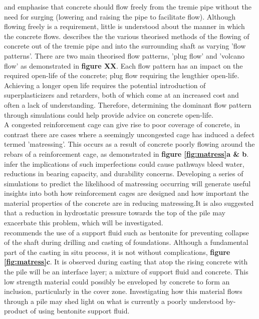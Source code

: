 \noindent
{} and  emphasise that concrete should flow freely from the tremie pipe without the need for surging (lowering and raising the pipe to facilitate flow). Although flowing freely is a requirement, little is understood about the manner in which the concrete flows.  describes the the various theorised methods of the flowing of concrete out of the tremie pipe and into the surrounding shaft as varying 'flow patterns'. There are two main theorised flow patterns, 'plug flow' and 'volcano flow' as demonstrated in {\bfseries figure XX}. Each flow pattern has an impact on the required open-life of the concrete; plug flow requiring the lengthier open-life. Achieving a longer open life requires the potential introduction of superplasticizers and retarders, both of which come at an increased cost and often a lack of understanding. Therefore, determining the dominant flow pattern through simulations could help provide advice on concrete open-life.\\

\noindent
A congested reinforcement cage can give rise to poor coverage of concrete, in contrast there are cases where a seemingly uncongested cage has induced a defect termed 'matressing'. This occurs as a result of concrete poorly flowing around the rebars of a reinforcement cage, as demonstrated in {\bfseries figure \ref{fig:matress}a \& b}. \citet{EFFC} infer the implications of such imperfections could cause pathways bleed water, reductions in bearing capacity, and durability concerns. Developing a series of simulations to predict the likelihood of matressing occurring will generate useful insights into both how reinforcement cages are designed and how important the material properties of the concrete are in reducing matressing.It is also suggested that a reduction in hydrostatic pressure towards the top of the pile may exacerbate this problem, which will be investigated.\\

\noindent
\citeauthor{BS1536} recommends the use of a support fluid such as bentonite for preventing collapse of the shaft during drilling and casting of foundations. Although a fundamental part of the casting in situ process, it is not without complications, {\bfseries figure \ref{fig:matress}c}. It is observed during casting that atop the rising concrete with the pile will be an interface layer; a mixture of support fluid and concrete. This low strength material could possibly be enveloped by concrete to form an inclusion, particularly in the cover zone. Investigating how this material flows through a pile may shed light on what is currently a poorly understood by-product of using bentonite support fluid. 


